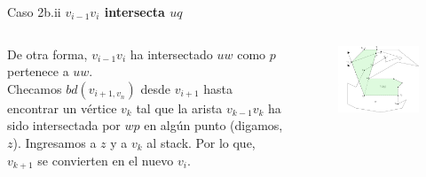 \documentclass[aspectratio=169,xcolor=dvipsnames, t]{beamer}
\begin{document}
\begin{frame}{Caso 2b.ii}
    \textbf{$v_{i-1}v_{i}$ intersecta $uq$}\\
    \vspace{0.5cm}
    \begin{columns}
      \begin{column}{0.45\textwidth}
        \small
        De otra forma, $v_{i-1}v_{i}$ ha intersectado $uw$ como $p$ pertenece a $uw$.\\
        \vspace{0.5cm}
        Checamos $bd(v_{i+1, v_{n}})$ desde $v_{i+1}$ hasta encontrar un vértice $v_{k}$ tal que la arista $v_{k-1}v_{k}$ ha sido intersectada por $wp$ en algún punto (digamos, $z$). %
    \vspace{0.5cm}
  Ingresamos a $z$ y a $v_{k}$ al stack. Por lo que, $v_{k+1}$ se convierten en el nuevo $v_{i}$.      
    \end{column}
    \begin{column}{0.45\textwidth}  %
    \vspace{-2.5cm}
        \begin{figure}
            \centering
            \includegraphics[width=1\textwidth]{imagenes/Caso2.7b.png}
        \end{figure}
    \end{column}
    \end{columns}
\end{frame}
\end{document}
